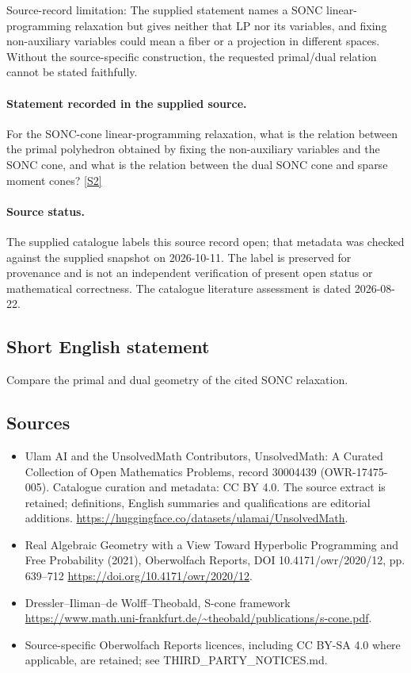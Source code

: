 \documentclass[11pt]{article}
\begin{document}
Source-record limitation: The supplied statement names a SONC linear-programming relaxation but gives neither that LP nor its variables, and fixing non-auxiliary variables could mean a fiber or a projection in different spaces. Without the source-specific construction, the requested primal/dual relation cannot be stated faithfully.
\paragraph{Statement recorded in the supplied source.}
For the SONC-cone linear-programming relaxation, what is the relation between the primal polyhedron obtained by fixing the non-auxiliary variables and the SONC cone, and what is the relation between the dual SONC cone and sparse moment cones? \href{https://doi.org/10.4171/owr/2020/12}{[S2]}
\paragraph{Source status.}
The supplied catalogue labels this source record open; that metadata was checked against the supplied snapshot on 2026-10-11. The label is preserved for provenance and is not an independent verification of present open status or mathematical correctness. The catalogue literature assessment is dated 2026-08-22.
\subsection{Short English statement}
Compare the primal and dual geometry of the cited SONC relaxation.
\subsection{Sources}
\begin{itemize}
\item[S1] Ulam AI and the UnsolvedMath Contributors, UnsolvedMath: A Curated Collection of Open Mathematics Problems, record 30004439 (OWR-17475-005). Catalogue curation and metadata: CC BY 4.0. The source extract is retained; definitions, English summaries and qualifications are editorial additions.
\url{https://huggingface.co/datasets/ulamai/UnsolvedMath}.
\item[S2] Real Algebraic Geometry with a View Toward Hyperbolic Programming and Free Probability (2021), Oberwolfach Reports, DOI 10.4171/owr/2020/12, pp. 639--712
\url{https://doi.org/10.4171/owr/2020/12}.
\item[S3] Dressler--Iliman--de Wolff--Theobald, S-cone framework
\url{https://www.math.uni-frankfurt.de/~theobald/publications/s-cone.pdf}.
\item Source-specific Oberwolfach Reports licences, including CC BY-SA 4.0 where applicable, are retained; see THIRD\_PARTY\_NOTICES.md.
\end{itemize}
\end{document}

